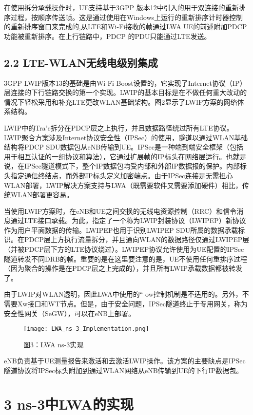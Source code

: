 在使用拆分承载操作时，UE支持基于3GPP 版本12中引入的用于双连接的重新排序过程，按顺序传送帧。这是通过使用在Windows上运行的重新排序计时器控制的重新排序窗口来完成的,从LTE和Wi-Fi接收的帧通过LWA UE的前述附加PDCP功能被重新排序。在上行链路中，PDCP 的PDU只能通过LTE发送。

\subsection*{2.2 LTE-WLAN无线电级别集成}

3GPP LWIP版本13的基础是由Wi-Fi Boost设置的，它实现了Internet协议（IP）层连接的下行链路交换的第一个实现。LWIP的基本目标是在不做任何重大改动的情况下轻松采用和补充LTE更改WLAN基础架构。图2显示了LWIP方案的网络体系结构。

LWIP中的Tra'c拆分在PDCP层之上执行，并且数据路径绕过所有LTE协议。LWIP聚合方案涉及Internet协议安全性（IPSec）的使用，隧道以通过WLAN基础结构将PDCP SDU数据包从eNB传输到UE。IPSec是一种端到端安全框架（包括用于相互认证的一组协议和算法），它通过扩展帧的IP标头在网络层运行。也就是说，在IPSec隧道模式下，整个IP数据包均受内部和外部IP数据报的保护。内部标头指定通信终结点，而外部IP标头定义加密端点。由于IPSec连接是无需担心WLAN部署，LWIP解决方案支持与LWA（既需要软件又需要添加硬件）相比，传统WLAN部署更容易。

当使用LWIP方案时，在eNB和UE之间交换的无线电资源控制（RRC）和信令消息通过LTE接口承载。为此，指定了一个称为LWIP封装协议（LWIPEP）新协议作为用户平面数据的传输。LWIPEP也用于识别LWIPEP SDU所属的数据承载标识。在PDCP层上方执行流量拆分，并且通向WLAN的数据路径仅通过LWIPEP层（并被PDCP层下方的LTE协议绕过）。LWIPEP协议允许使用为UE配置的IPSec隧道转发不同DRB的帧。重要的是在这里要注意的是，UE不使用任何重排序过程（因为聚合的操作是在PDCP层之上完成的），并且所有LWIP承载数据都被转发了。

由于LWIP对WLAN透明，因此LWA中使用的“ ow控制机制是不适用的。另外，不需要Xw接口和WT节点。但是，由于安全问题，IPSec隧道终止于专用网关，称为安全性网关（SeGW），可以在eNB上部署。

\begin{figure}[htb]
  \centering
  \texttt{[image: LWA\_ns-3\_Implementation.png]}
  \caption*{图3：LWA ns-3实现}
\end{figure}

eNB负责基于UE测量报告来激活和去激活LWIP操作。该方案的主要缺点是IPSec隧道协议将IPSec标头附加到通过WLAN网络从eNB传输到UE的下行IP数据包。

\newpage
\section*{3 ns-3中LWA的实现}

